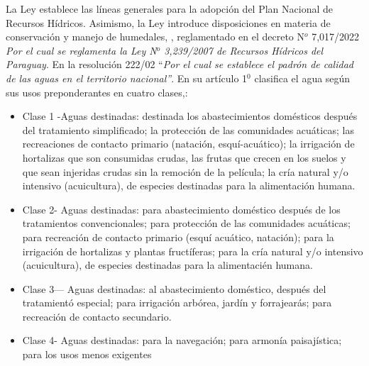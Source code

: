 La Ley establece las líneas generales para la adopción del Plan Nacional de Recursos Hídricos. Asimismo, la Ley introduce disposiciones en materia de conservación y manejo de humedales, \cite{ley_n_323907_ley_2007}, reglamentado en el  decreto N$^{o}$ 7,017/2022 \textit{Por el cual se reglamenta la Ley N$^{o}$ 3,239/2007 de Recursos Hídricos del Paraguay}.
En la resoluci\'on 222/02 “\textit{Por el cual se establece el padr\'on de calidad de las aguas en el territorio nacional”}. En su art\'iculo 1$^{0}$ clasifica el agua seg\'un sus usos preponderantes en cuatro clases,\cite{la-secretaria-del-ambiente-2002}:
\begin{itemize}
    \item Clase 1 -Aguas destinadas: 
    destinada los abastecimientos dom\'esticos despu\'es del tratamiento simplificado; 
    la protecci\'on de las comunidades acu\'aticas;
    las recreaciones de contacto primario (nataci\'on, esqu\'i-acu\'atico);
    la irrigaci\'on de hortalizas que son consumidas crudas, las frutas que crecen en los suelos y que sean injeridas crudas sin la remoci\'on de la pel\'icula; 
    la cr\'ia natural y/o intensivo (acuicultura), de especies destinadas para la alimentaci\'on humana.
    \item Clase 2- Aguas destinadas:
    para abastecimiento dom\'estico después de los tratamientos convencionales; 
    para protección de las comunidades acuáticas; para recreación de contacto primario (esquí acuático, natación); 
    para la irrigación de hortalizas y plantas fruct\'iferas; 
    para la cría natural y/o intensivo (acuicultura), de especies destinadas para la alimentaci\'en humana.
    \item Clase 3— Aguas destinadas: 
    al abastecimiento dom\'estico, despu\'es del tratamient\'o especial; 
    para irrigación arbórea, jardín y forrajear\'as; 
    para recreaci\'on de contacto secundario.
    \item Clase 4- Aguas destinadas: 
    para la navegación; 
    para armonía paisaj\'istica; 
    para los usos menos exigentes
\end{itemize}

